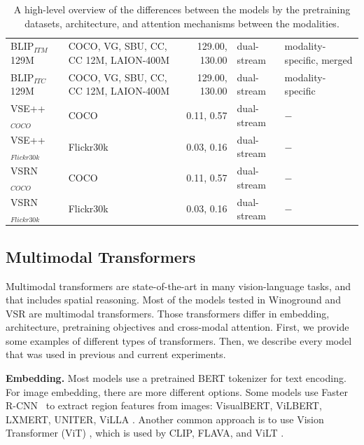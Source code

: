 \begin{table}[ht]
\begin{adjustbox}{max width=\textwidth}
\begin{tabular}{l|lr|l|l}
    BLIP$_{ITM}$ 129M \cite{li2022blip} & COCO, VG, SBU, CC, CC 12M, LAION-400M & 129.00,   130.00 &   dual-stream & modality-specific, merged \\
    BLIP$_{ITC}$ 129M \cite{li2022blip} & COCO, VG, SBU, CC, CC 12M, LAION-400M & 129.00,   130.00 &   dual-stream &         modality-specific \\
    VSE++ $_{COCO}$ \cite{faghri2018vse} & COCO & 0.11, 0.57 & dual-stream & $-$\\
    VSE++ $_{Flickr30k}$ \cite{faghri2018vse} & Flickr30k & 0.03, 0.16 & dual-stream & $-$\\
    VSRN $_{COCO}$ \cite{li2019vsrn}  & COCO & 0.11, 0.57 & dual-stream & $-$\\
    VSRN $_{Flickr30k}$ \cite{li2019vsrn} & Flickr30k & 0.03, 0.16 & dual-stream & $-$\\
    \bottomrule
    \end{tabular}
    \end{adjustbox}
    \caption{A high-level overview of the differences between the models by the pretraining datasets, architecture, and attention mechanisms between the modalities.}
    \label{tab:model-types}
\end{table}

\subsection{Multimodal Transformers} \label{sec:multimodal_transformers}

Multimodal transformers are state-of-the-art in many vision-language tasks, and that includes spatial reasoning. Most of the models tested in Winoground \cite{thrush2022winoground} and VSR \cite{liu2022visual} are multimodal transformers. Those transformers differ in embedding, architecture, pretraining objectives and cross-modal attention. First, we provide some examples of different types of transformers. Then, we describe every model that was used in previous and current experiments.

\textbf{Embedding.} Most models use a pretrained BERT tokenizer for text encoding. For image embedding, there are more different options. Some models use Faster R-CNN~\cite{ren2015faster} to extract region features from images: VisualBERT, ViLBERT, LXMERT, UNITER, ViLLA \cite{li2019visualbert,lu2019vilbert,tan2020lxmert,chen2020uniter,gan2020villa}. Another common approach is to use Vision Transformer (ViT) \cite{dosovitskiy2020imageworth}, which is used by CLIP, FLAVA, and ViLT \cite{radford2021clip, singh2022flava, kim2021vilt}.

